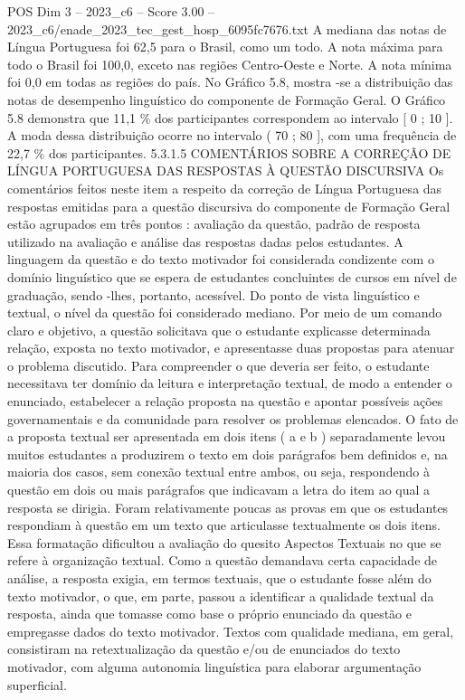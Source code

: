 \begin{textsample}{POS Dim 3 – 2023\_c6 – Score 3.00 – 2023\_c6/enade\_2023\_tec\_gest\_hosp\_6095fc7676.txt}
A mediana das notas de Língua Portuguesa foi 62,5 para o Brasil, como um todo.
A nota máxima para todo o Brasil foi 100,0, exceto nas regiões Centro-Oeste e Norte.
A nota mínima foi 0,0 em todas as regiões do país.
No Gráfico 5.8, mostra -se a distribuição das notas de desempenho linguístico do componente de Formação Geral.
O Gráfico 5.8 demonstra que 11,1 \% dos participantes correspondem ao intervalo [ 0 ; 10 ].
A moda dessa distribuição ocorre no intervalo ( 70 ; 80 ], com uma frequência de 22,7 \% dos participantes. 5.3.1.5 COMENTÁRIOS SOBRE A CORREÇÃO DE LÍNGUA PORTUGUESA DAS RESPOSTAS À QUESTÃO DISCURSIVA Os comentários feitos neste item a respeito da correção de Língua Portuguesa das respostas emitidas para a questão discursiva do componente de Formação Geral estão agrupados em três pontos : avaliação da questão, padrão de resposta utilizado na avaliação e análise das respostas dadas pelos estudantes.
A linguagem da questão e do texto motivador foi considerada condizente com o domínio linguístico que se espera de estudantes concluintes de cursos em nível de graduação, sendo -lhes, portanto, acessível.
Do ponto de vista linguístico e textual, o nível da questão foi considerado mediano.
Por meio de um comando claro e objetivo, a questão solicitava que o estudante explicasse determinada relação, exposta no texto motivador, e apresentasse duas propostas para atenuar o problema discutido.
Para compreender o que deveria ser feito, o estudante necessitava ter domínio da leitura e interpretação textual, de modo a entender o enunciado, estabelecer a relação proposta na questão e apontar possíveis ações governamentais e da comunidade para resolver os problemas elencados.
O fato de a proposta textual ser apresentada em dois itens ( a e b ) separadamente levou muitos estudantes a produzirem o texto em dois parágrafos bem definidos e, na maioria dos casos, sem conexão textual entre ambos, ou seja, respondendo à questão em dois ou mais parágrafos que indicavam a letra do item ao qual a resposta se dirigia.
Foram relativamente poucas as provas em que os estudantes respondiam à questão em um texto que articulasse textualmente os dois itens.
Essa formatação dificultou a avaliação do quesito Aspectos Textuais no que se refere à organização textual.
Como a questão demandava certa capacidade de análise, a resposta exigia, em termos textuais, que o estudante fosse além do texto motivador, o que, em parte, passou a identificar a qualidade textual da resposta, ainda que tomasse como base o próprio enunciado da questão e empregasse dados do texto motivador.
Textos com qualidade mediana, em geral, consistiram na retextualização da questão e/ou de enunciados do texto motivador, com alguma autonomia linguística para elaborar argumentação superficial.

\end{textsample}
